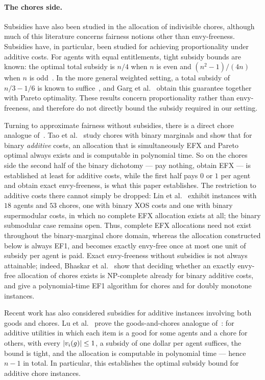 \paragraph{The chores side.}
Subsidies have also been studied in the allocation of indivisible chores, although much of this literature concerns fairness notions
other than envy-freeness. Subsidies have, in particular, been studied for achieving proportionality under additive costs. For agents with equal entitlements, tight subsidy bounds are known: the optimal total subsidy is $n/4$ when $n$ is even and $(n^2-1)/(4n)$ when $n$ is odd~\cite{wu2025revisiting}. In the more general
weighted setting, a total subsidy of $n/3-1/6$ is known to suffice~\cite{wu2024tree}, and Garg et al.~\cite{GSW25} obtain this guarantee together with Pareto optimality. These results concern proportionality rather than envy-freeness, and therefore do not directly bound the subsidy required in our setting.

Turning to approximate fairness without subsidies, there is a direct chore analogue of~\cite{BSY23}. Tao et al.~\cite{TWYZ23} study chores with binary marginals and show that for binary \emph{additive} costs, an allocation that is simultaneously EFX and Pareto optimal always exists and is computable in polynomial time. So on the chores side the second half of the binary dichotomy --- pay nothing, obtain EFX --- is
established at least for additive costs, while the first half pays $0$ or $1$ per agent and obtain exact envy-freeness, is what this paper establishes. The restriction to additive costs there cannot simply be dropped: Lin et al.~\cite{LLTZ26} exhibit instances with $18$ agents and $53$ chores, one with binary XOS costs and one with binary supermodular costs, in which no complete EFX allocation exists at all; the binary submodular case remains open. Thus, complete EFX allocations need not exist throughout the binary-marginal chore domain, whereas the allocation constructed below is always EF1, and becomes exactly envy-free once at most one unit of subsidy per agent is paid. Exact envy-freeness without subsidies is not always attainable; indeed, Bhaskar et al.~\cite{BSV21} show that deciding whether an exactly envy-free allocation of chores exists is NP-complete already for binary additive costs, and give a polynomial-time EF1 algorithm for chores and for doubly
monotone instances.

Recent work has also considered subsidies for additive instances involving both goods and chores. Lu et
al.~\cite{LMS26} prove the goods-and-chores analogue of~\cite{BDNSV20}: for
additive utilities in which each item is a good for some agents and a chore for
others, with every $\left\lvert v_i(g)\right\rvert \le 1$, a subsidy of one dollar per agent
suffices, the bound is tight, and the allocation is computable in polynomial
time --- hence $n-1$ in total. In particular, this establishes the optimal subsidy bound for additive chore instances.

